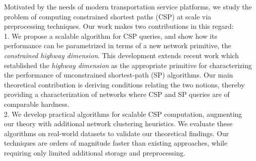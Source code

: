 Motivated by the needs of modern transportation service platforms, we study the problem of computing constrained shortest paths (CSP) at scale via preprocessing techniques.
Our work makes two contributions in this regard:\\
1. We propose a scalable algorithm for CSP queries, and show how its performance can be parametrized in terms of a new network primitive, the \emph{constrained highway dimension}.
This development extends recent work which established the \emph{highway dimension} as the appropriate primitive for characterizing the performance of unconstrained shortest-path (SP) algorithms.
Our main theoretical contribution is deriving conditions relating the two notions, thereby providing a characterization of networks where CSP and SP queries are of comparable hardness.\\
2. We develop practical algorithms for scalable CSP computation, augmenting our theory with additional network clustering heuristics. 
We evaluate these algorithms on real-world datasets to validate our theoretical findings. 
Our techniques are orders of magnitude faster than existing approaches, while requiring only limited additional storage and preprocessing.